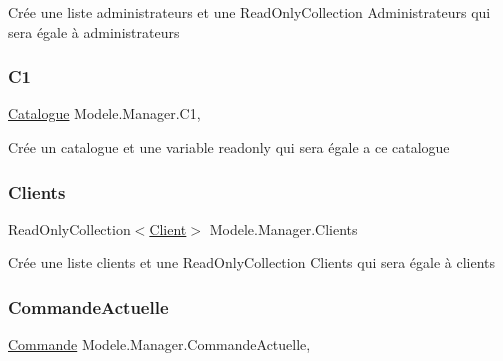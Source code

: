 Crée une liste administrateurs et une Read\+Only\+Collection Administrateurs qui sera égale à administrateurs 

\mbox{\label{classModele_1_1Manager_a54bbc7bd646fcaa0f1a590310dd3c02c}} 
\subsubsection{\texorpdfstring{C1}{C1}}
{\footnotesize\ttfamily \hyperlink{classModele_1_1Catalogue}{Catalogue} Modele.\+Manager.\+C1\hspace{0.3cm}{\ttfamily [get]}, {\ttfamily [set]}}



Crée un catalogue et une variable readonly qui sera égale a ce catalogue 

\mbox{\label{classModele_1_1Manager_aa91d850a379289e56012fc9b3912a7fe}} 
\subsubsection{\texorpdfstring{Clients}{Clients}}
{\footnotesize\ttfamily Read\+Only\+Collection$<$\hyperlink{classModele_1_1Client}{Client}$>$ Modele.\+Manager.\+Clients\hspace{0.3cm}{\ttfamily [get]}}



Crée une liste clients et une Read\+Only\+Collection Clients qui sera égale à clients 

\mbox{\label{classModele_1_1Manager_a4b53ccf46b594f580933c26c59892dd7}} 
\subsubsection{\texorpdfstring{Commande\+Actuelle}{CommandeActuelle}}
{\footnotesize\ttfamily \hyperlink{classModele_1_1Commande}{Commande} Modele.\+Manager.\+Commande\+Actuelle\hspace{0.3cm}{\ttfamily [get]}, {\ttfamily [set]}}



